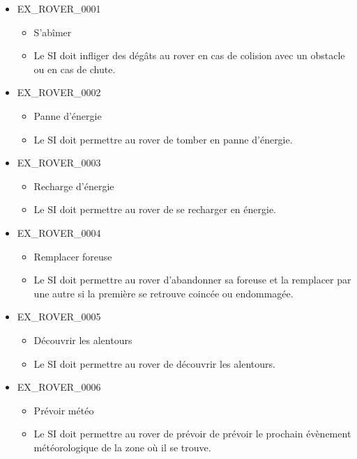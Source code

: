 \documentclass[12pt,a4paper]{scrartcl}
\begin{document}
\begin{itemize}

\item EX\_ROVER\_0001
\begin{itemize}
\item S'abîmer
\item Le SI doit infliger des dégâts au rover en cas de colision avec un obstacle ou en cas de chute.
\end{itemize}

\item EX\_ROVER\_0002
\begin{itemize}
\item Panne d'énergie
\item Le SI doit permettre au rover de tomber en panne d'énergie.
\end{itemize}

\item EX\_ROVER\_0003
\begin{itemize}
\item Recharge d'énergie
\item Le SI doit permettre au rover de se recharger en énergie.
\end{itemize}

\item EX\_ROVER\_0004
\begin{itemize}
\item Remplacer foreuse
\item Le SI doit permettre au rover d'abandonner sa foreuse et la remplacer par 
		une autre si la première se retrouve coincée ou endommagée.
\end{itemize}

\item EX\_ROVER\_0005
\begin{itemize}
\item Découvrir les alentours
\item Le SI doit permettre au rover de découvrir les alentours.
\end{itemize}

\item EX\_ROVER\_0006
\begin{itemize}
\item Prévoir météo
\item Le SI doit permettre au rover de prévoir de prévoir le prochain évènement
		météorologique de la zone où il se trouve.
\end{itemize}

\end{itemize}
\end{document}

